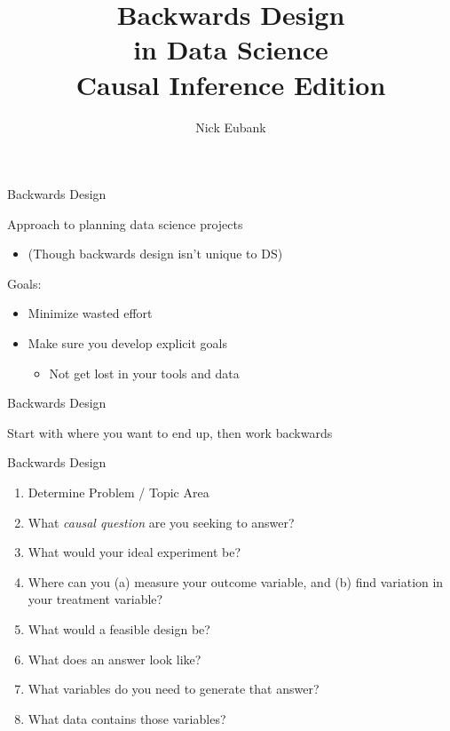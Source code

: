 \documentclass[11pt]{beamer}
\title{Backwards Design \\ in Data Science \\ Causal Inference Edition}
\author{\small Nick Eubank}
\date{\vspace*{.3in} \date}
\begin{document}
\begin{frame}
\maketitle
\end{frame}

\begin{frame}[c]{Backwards Design}

Approach to planning data science projects
  \begin{itemize}
    \pause \item (Though backwards design isn't unique to DS)
  \end{itemize}
Goals:
\begin{itemize}
  \item Minimize wasted effort
  \pause \item Make sure you develop explicit goals
  \begin{itemize}
    \item Not get lost in your tools and data
  \end{itemize}
\end{itemize}
\end{frame}

\begin{frame}[c]{Backwards Design}

  Start with where you want to end up, then work backwards

\end{frame}

\begin{frame}[c]{Backwards Design}
  \begin{enumerate}
    \pause \item Determine Problem / Topic Area
    \pause \item What \emph{causal question} are you seeking to answer?
    \pause \item What would your ideal experiment be?
    \pause \item Where can you (a) measure your outcome variable, and (b) find variation in your treatment variable?
    \pause \item What would a feasible design be?
    \pause \item What does an answer look like?
    \pause \item What variables do you need to generate that answer?
    \pause \item What data contains those variables?
  \end{enumerate}
\end{frame}
\end{document}
